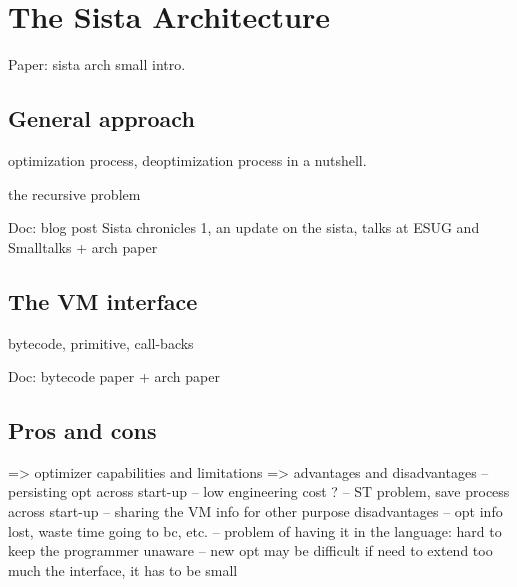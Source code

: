 \documentclass[a4paper,12pt,twoside]{../includes/ThesisStyle}
\begin{document}
\fi

\chapter{The Sista Architecture}
\label{chap:archTheory}
\minitoc

Paper: sista arch
small intro. 

\section{General approach}

optimization process, deoptimization process in a nutshell.

the recursive problem

Doc: blog post Sista chronicles 1, an update on the sista, talks at ESUG and Smalltalks + arch paper

\section{The VM interface}

bytecode, primitive, call-backs

Doc: bytecode paper + arch paper

\section{Pros and cons}
=> optimizer capabilities and limitations
=> advantages and disadvantages
-- persisting opt across start-up 
-- low engineering cost ?
-- ST problem, save process across start-up
-- sharing the VM info for other purpose
disadvantages
-- opt info lost, waste time going to bc, etc.
-- problem of having it in the language: hard to keep the programmer unaware
-- new opt may be difficult if need to extend too much the interface, it has to be small

\ifx\wholebook\relax\else
    
\end{document}
